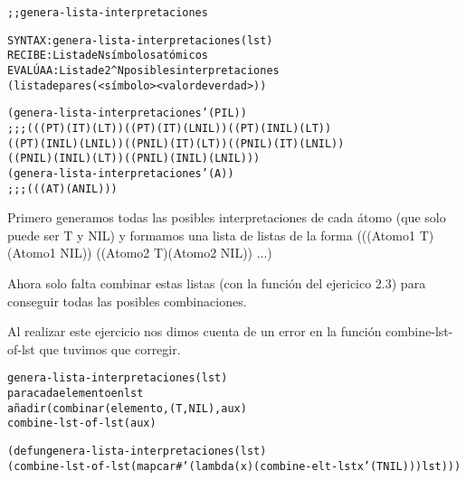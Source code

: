 \begin{aibox}{\function}
\begin{alltt}
;; genera-lista-interpretaciones

SYNTAX: genera-lista-interpretaciones (lst) 
RECIBE   : Lista de N símbolos atómicos
EVALÚA A : Lista de 2^N posibles interpretaciones
             (lista de pares (<símbolo> <valor de verdad>))

\end{alltt}
\end{aibox}

\begin{aibox}{\examples}
\begin{alltt}
(genera-lista-interpretaciones '(P I L))
;;; (((P T) (I T) (L T)) ((P T) (I T) (L NIL)) ((P T) (I NIL) (L T))
 ((P T) (I NIL) (L NIL)) ((P NIL) (I T) (L T)) ((P NIL) (I T) (L NIL))
 ((P NIL) (I NIL) (L T)) ((P NIL) (I NIL) (L NIL)))
 (genera-lista-interpretaciones '(A))
;;; (((A T) (A NIL)))
\end{alltt}

\end{aibox}

\begin{aibox}{\comments}
Primero generamos todas las posibles interpretaciones de cada átomo (que solo puede ser T y NIL) y formamos una lista de listas de la forma (((Atomo1 T) (Atomo1 NIL)) ((Atomo2 T)(Atomo2 NIL)) ...)

Ahora solo falta combinar estas listas (con la función del ejericico 2.3) para conseguir todas las posibles combinaciones.

Al realizar este ejercicio nos dimos cuenta de un error en la función combine-lst-of-lst que tuvimos que corregir.
\end{aibox}

\begin{aibox}{\pseudocode}
\begin{alltt}
genera-lista-interpretaciones (lst)
    para cada elemento en lst
        añadir ( combinar(elemento, (T, NIL), aux)
    combine-lst-of-lst (aux)
\end{alltt}
\end{aibox}
\begin{aibox}{\code}

\begin{alltt}
(defun genera-lista-interpretaciones (lst) 
    (combine-lst-of-lst (mapcar #'(lambda (x) (combine-elt-lst x '(T NIL))) lst)))
\end{alltt}
\end{aibox}
